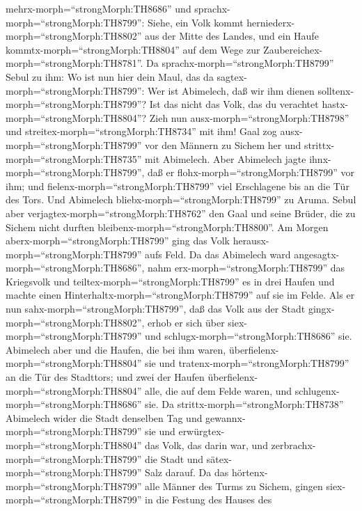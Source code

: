 mehrx-morph=``strongMorph:TH8686'' und
sprachx-morph=``strongMorph:TH8799'': Siehe, ein Volk kommt
herniederx-morph=``strongMorph:TH8802'' aus der Mitte des Landes, und
ein Haufe kommtx-morph=``strongMorph:TH8804'' auf dem Wege zur
Zaubereichex-morph=``strongMorph:TH8781''.  Da
sprachx-morph=``strongMorph:TH8799'' Sebul zu ihm: Wo ist nun hier dein
Maul, das da sagtex-morph=``strongMorph:TH8799'': Wer ist Abimelech, daß
wir ihm dienen solltenx-morph=``strongMorph:TH8799''? Ist das nicht das
Volk, das du verachtet hastx-morph=``strongMorph:TH8804''? Zieh nun
ausx-morph=``strongMorph:TH8798'' und
streitex-morph=``strongMorph:TH8734'' mit ihm!  Gaal zog
ausx-morph=``strongMorph:TH8799'' vor den Männern zu Sichem her und
strittx-morph=``strongMorph:TH8735'' mit Abimelech.  Aber
Abimelech jagte ihnx-morph=``strongMorph:TH8799'', daß er
flohx-morph=``strongMorph:TH8799'' vor ihm; und
fielenx-morph=``strongMorph:TH8799'' viel Erschlagene bis an die Tür des
Tors.  Und Abimelech bliebx-morph=``strongMorph:TH8799'' zu
Aruma. Sebul aber verjagtex-morph=``strongMorph:TH8762'' den Gaal und
seine Brüder, die zu Sichem nicht durften
bleibenx-morph=``strongMorph:TH8800''.  Am Morgen
aberx-morph=``strongMorph:TH8799'' ging das Volk
herausx-morph=``strongMorph:TH8799'' aufs Feld. Da das Abimelech ward
angesagtx-morph=``strongMorph:TH8686'',  nahm
erx-morph=``strongMorph:TH8799'' das Kriegsvolk und
teiltex-morph=``strongMorph:TH8799'' es in drei Haufen und machte einen
Hinterhaltx-morph=``strongMorph:TH8799'' auf sie im Felde. Als er nun
sahx-morph=``strongMorph:TH8799'', daß das Volk aus der Stadt
gingx-morph=``strongMorph:TH8802'', erhob er sich über
siex-morph=``strongMorph:TH8799'' und
schlugx-morph=``strongMorph:TH8686'' sie.  Abimelech aber
und die Haufen, die bei ihm waren,
überfielenx-morph=``strongMorph:TH8804'' sie und
tratenx-morph=``strongMorph:TH8799'' an die Tür des Stadttors; und zwei
der Haufen überfielenx-morph=``strongMorph:TH8804'' alle, die auf dem
Felde waren, und schlugenx-morph=``strongMorph:TH8686'' sie.
 Da strittx-morph=``strongMorph:TH8738'' Abimelech wider
die Stadt denselben Tag und gewannx-morph=``strongMorph:TH8799'' sie und
erwürgtex-morph=``strongMorph:TH8804'' das Volk, das darin war, und
zerbrachx-morph=``strongMorph:TH8799'' die Stadt und
sätex-morph=``strongMorph:TH8799'' Salz darauf.  Da das
hörtenx-morph=``strongMorph:TH8799'' alle Männer des Turms zu Sichem,
gingen siex-morph=``strongMorph:TH8799'' in die Festung des Hauses des

